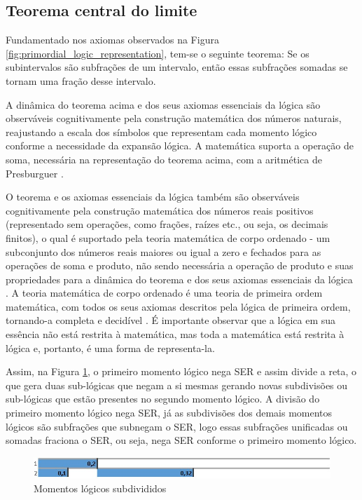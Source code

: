\subsection{Teorema central do limite}
Fundamentado nos axiomas observados na Figura \ref{fig:primordial_logic_representation}, tem-se o seguinte teorema: Se os subintervalos são subfrações de um intervalo, então essas subfrações somadas se tornam uma fração desse intervalo.

A dinâmica do teorema acima e dos seus axiomas essenciais da lógica são observáveis cognitivamente pela construção matemática dos números naturais, reajustando a escala dos símbolos que representam cada momento lógico conforme a necessidade da expansão lógica. A matemática suporta a operação de soma, necessária na representação do teorema acima, com a aritmética de Presburguer \cite{wiki_AritmeticaPresburger}.

O teorema e os axiomas essenciais da lógica também são observáveis cognitivamente pela construção matemática dos números reais positivos (representado sem operações, como frações, raízes etc., ou seja, os decimais finitos), o qual é suportado pela teoria matemática de corpo ordenado - um subconjunto dos números reais maiores ou igual a zero e fechados para as operações de soma e produto, não sendo necessária a operação de produto e suas propriedades para a dinâmica do teorema e dos seus axiomas essenciais da lógica \cite{wiki_CorpoOrdenado}. A teoria matemática de corpo ordenado é uma teoria de primeira ordem matemática, com todos os seus axiomas descritos pela lógica de primeira ordem, tornando-a completa e decidível \cite{wiki_RealClosedField}. É importante observar que a lógica em sua essência não está restrita à matemática, mas toda a matemática está restrita à lógica e, portanto, é uma forma de representa-la.

Assim, na Figura \ref{fig:second_logical_moment}, o primeiro momento lógico nega SER e assim divide a reta, o que gera duas sub-lógicas que negam a si mesmas gerando novas subdivisões ou sub-lógicas que estão presentes no segundo momento lógico. A divisão do primeiro momento lógico nega SER, já as subdivisões dos demais momentos lógicos são subfrações que subnegam o SER, logo essas subfrações unificadas ou somadas fraciona o SER, ou seja, nega SER conforme o primeiro momento lógico.
	\begin{figure}[H]
	\caption{Momentos lógicos subdivididos}
	\label{fig:second_logical_moment}
	\centering
	\includegraphics[scale=.85]{sections/images/second_logical_moment.jpg}
	\end{figure}

